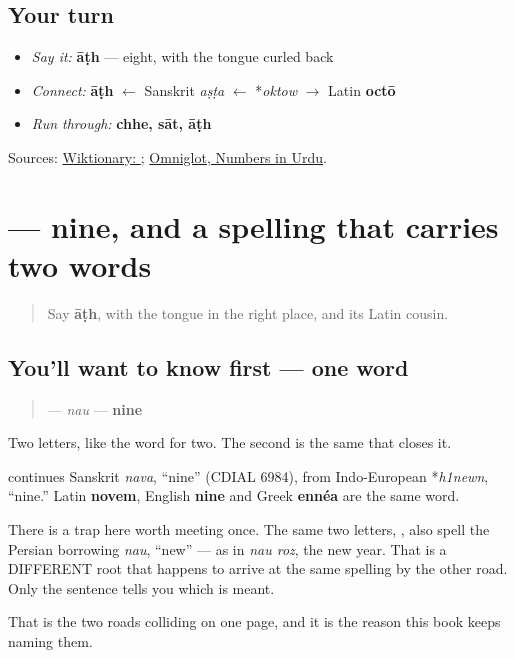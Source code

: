 \subsection*{Your turn}
\begin{itemize}
\raggedright
  \item \emph{Say it:} \textbf{āṭh} — eight, with the tongue curled back
  \item \emph{Connect:} \textbf{āṭh} $\leftarrow$ Sanskrit \emph{aṣṭa} $\leftarrow$ *\emph{oktow} $\to$ Latin \textbf{octō}
  \item \emph{Run through:} \textbf{chhe, sāt, āṭh}
\end{itemize}

\begin{tcolorbox}[breakable,colback=teal!4,colframe=teal!35!black,title={Before you move on}]
Sources: \href{https://en.wiktionary.org/wiki/\%D8\%A2\%D9\%B9\%DA\%BE}{Wiktionary: }; \href{https://www.omniglot.com/language/numbers/urdu.htm}{Omniglot, Numbers in Urdu}.
\end{tcolorbox}
\section[\texorpdfstring{\ur{نو} (nau)}{نو (nau)}]{ — nine, and a spelling that carries two words}

\label{lesson:UR-C29-nau}



\begin{quote}
Say \textbf{āṭh}, with the tongue in the right place, and its Latin cousin.
\end{quote}

\subsection*{You'll want to know first — one word}
\begin{quote}
\textbf{} — \emph{nau} — \textbf{nine}
\end{quote}

Two letters, like the word for two. The second is the same \textbf{} that closes it.

\begin{cousinweb}
\textbf{} continues Sanskrit \emph{nava}, \textquotedblleft{}nine\textquotedblright{} (CDIAL 6984), from Indo-European *\emph{h1newn}, \textquotedblleft{}nine.\textquotedblright{} Latin \textbf{novem}, English \textbf{nine} and Greek \textbf{ennéa} are the same word.

There is a trap here worth meeting once. The same two letters, \textbf{}, also spell the Persian borrowing \emph{nau}, \textquotedblleft{}new\textquotedblright{} — as in \emph{nau roz}, the new year. That is a DIFFERENT root that happens to arrive at the same spelling by the other road. Only the sentence tells you which is meant.

That is the two roads colliding on one page, and it is the reason this book keeps naming them.
\end{cousinweb}

